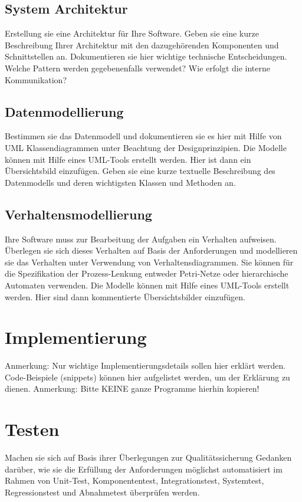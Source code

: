 \documentclass[
   draft=false
  ,paper=a4
  ,twoside=true
  ,fontsize=11pt
  ,headsepline
  ,DIV11
  ,parskip=full+
]{scrartcl} %
\begin{document}
\subsection{System Architektur}
Erstellung sie eine Architektur für Ihre Software. Geben sie eine kurze Beschreibung Ihrer Architektur mit den dazugehörenden Komponenten und Schnittstellen an. Dokumentieren sie hier wichtige technische Entscheidungen. Welche Pattern werden gegebenenfalls verwendet? Wie erfolgt die interne Kommunikation?
\subsection{Datenmodellierung}
Bestimmen sie das Datenmodell und dokumentieren sie es hier mit Hilfe von UML Klassendiagrammen unter Beachtung der Designprinzipien. Die Modelle können mit Hilfe eines UML-Tools erstellt werden. Hier ist dann ein Übersichtsbild einzufügen.
Geben sie eine kurze textuelle Beschreibung des Datenmodells und deren wichtigsten Klassen und Methoden an.
\subsection{Verhaltensmodellierung}
Ihre Software muss zur Bearbeitung der Aufgaben ein Verhalten aufweisen. Überlegen sie sich dieses Verhalten auf Basis der Anforderungen und modellieren sie das Verhalten unter Verwendung von Verhaltensdiagrammen. Sie können für die Spezifikation der Prozess-Lenkung entweder Petri-Netze oder hierarchische Automaten verwenden. Die Modelle können mit Hilfe eines UML-Tools erstellt werden. Hier sind dann kommentierte Übersichtsbilder einzufügen.
\newpage
\section{Implementierung}
Anmerkung: Nur wichtige Implementierungsdetails sollen hier erklärt werden. Code-Beispiele (snippets) können hier aufgelistet werden, um der Erklärung zu dienen. 
Anmerkung: Bitte KEINE ganze Programme hierhin kopieren!
\newpage
\section{Testen}
Machen sie sich auf Basis ihrer Überlegungen zur Qualitätssicherung Gedanken darüber, wie sie die Erfüllung der Anforderungen möglichst automatisiert im Rahmen von Unit-Test, Komponententest, Integrationstest, Systemtest, Regressionstest und Abnahmetest überprüfen werden.
\end{document}
